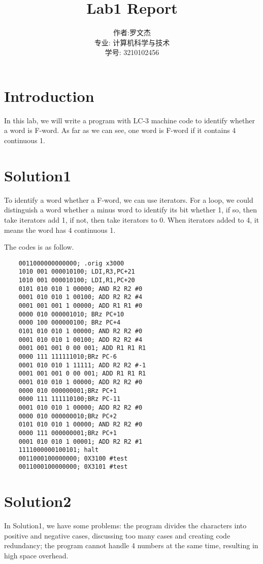 \documentclass[20pt]{ctexart}
\title{Lab1 Report}
\author{作者:罗文杰\\专业: 计算机科学与技术\\学号: 3210102456}
\date{}
\begin{document}
\maketitle

\section{Introduction}
In this lab, we will write a program with LC-3 machine code to identify whether a word is F-word. As far as we can see, one word is F-word if it contains 4 continuous 1.

\section{Solution1}
To identify a word whether a F-word, we can use iterators. For a loop, we could distinguish a word whether a minus word to identify its bit whether 1, if so, then take iterators add 1, if not, then take iterators to 0. When iterators added to 4, it means the word has 4 continuous 1.

The codes is as follow.

\begin{verbatim}
    0011000000000000; .orig x3000
    1010 001 000010100; LDI,R3,PC+21
    1010 001 000010100; LDI,R1,PC+20
    0101 010 010 1 00000; AND R2 R2 #0
    0001 010 010 1 00100; ADD R2 R2 #4
    0001 001 001 1 00000; ADD R1 R1 #0
    0000 010 000001010; BRz PC+10
    0000 100 000000100; BRz PC+4
    0101 010 010 1 00000; AND R2 R2 #0
    0001 010 010 1 00100; ADD R2 R2 #4
    0001 001 001 0 00 001; ADD R1 R1 R1
    0000 111 111111010;BRz PC-6
    0001 010 010 1 11111; ADD R2 R2 #-1
    0001 001 001 0 00 001; ADD R1 R1 R1
    0001 010 010 1 00000; ADD R2 R2 #0
    0000 010 000000001;BRz PC+1
    0000 111 111110100;BRz PC-11
    0001 010 010 1 00000; ADD R2 R2 #0
    0000 010 000000010;BRz PC+2
    0101 010 010 1 00000; AND R2 R2 #0
    0000 111 000000001;BRz PC+1
    0001 010 010 1 00001; ADD R2 R2 #1
    1111000000100101; halt
    0011000100000000; 0X3100 #test
    0011000100000000; 0X3101 #test
    \end{verbatim}

\section{Solution2}
In Solution1, we have some problems: the program divides the characters into positive and negative cases, discussing too many cases and creating code redundancy; the program cannot handle 4 numbers at the same time, resulting in high space overhead.
\end{document}
